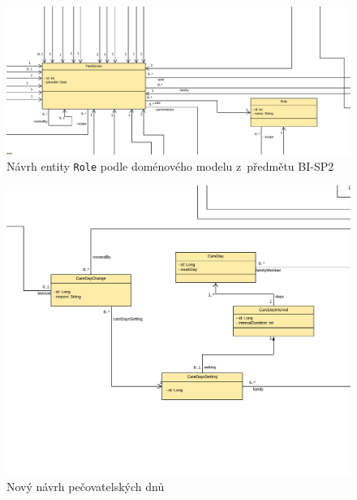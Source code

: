         \begin{figure}\centering
	        \includegraphics[angle=90, height=0.9\textheight]{pdfs/Role1}
	        \caption[Návrh \texttt{Role}]{Návrh entity \texttt{Role} podle doménového modelu z~předmětu BI-SP2}\label{image:Role1}
        \end{figure}
    \begin{figure}\centering
	       \includegraphics[angle=90, height=0.9\textheight]{pdfs/CareDays2}
	       \caption[Nový návrh pečovatelských dnů]{Nový návrh pečovatelských dnů}\label{image:caredays2}
        \end{figure}
